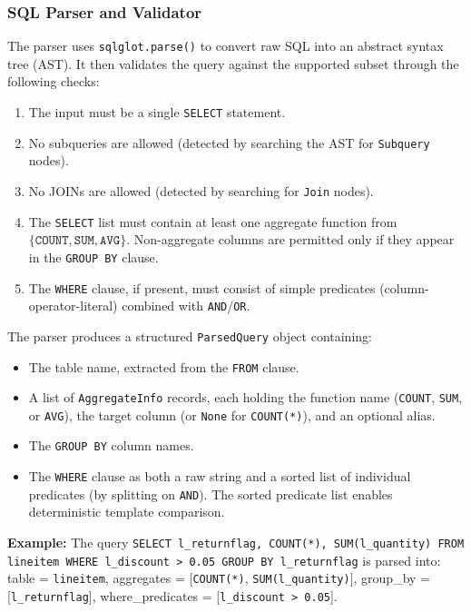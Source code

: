 \documentclass[sigconf,nonacm]{acmart}
\begin{document}
\subsubsection{SQL Parser and Validator}

The parser uses \texttt{sqlglot.parse()} to convert raw SQL into an abstract syntax tree (AST). It then validates the query against the supported subset through the following checks:

\begin{enumerate}
    \item The input must be a single \texttt{SELECT} statement.
    \item No subqueries are allowed (detected by searching the AST for \texttt{Subquery} nodes).
    \item No JOINs are allowed (detected by searching for \texttt{Join} nodes).
    \item The \texttt{SELECT} list must contain at least one aggregate function from $\{\texttt{COUNT}, \texttt{SUM}, \texttt{AVG}\}$. Non-aggregate columns are permitted only if they appear in the \texttt{GROUP BY} clause.
    \item The \texttt{WHERE} clause, if present, must consist of simple predicates (column-operator-literal) combined with \texttt{AND}/\texttt{OR}.
\end{enumerate}

The parser produces a structured \texttt{ParsedQuery} object containing:
\begin{itemize}
    \item The table name, extracted from the \texttt{FROM} clause.
    \item A list of \texttt{AggregateInfo} records, each holding the function name (\texttt{COUNT}, \texttt{SUM}, or \texttt{AVG}), the target column (or \texttt{None} for \texttt{COUNT(*)}), and an optional alias.
    \item The \texttt{GROUP BY} column names.
    \item The \texttt{WHERE} clause as both a raw string and a sorted list of individual predicates (by splitting on \texttt{AND}). The sorted predicate list enables deterministic template comparison.
\end{itemize}

\noindent\textbf{Example:} The query \texttt{SELECT l\_returnflag, COUNT(*), SUM(l\_quantity) FROM lineitem WHERE l\_discount > 0.05 GROUP BY l\_returnflag} is parsed into: table = \texttt{lineitem}, aggregates = [\texttt{COUNT(*)}, \texttt{SUM(l\_quantity)}], group\_by = [\texttt{l\_returnflag}], where\_predicates = [\texttt{l\_discount > 0.05}].
\end{document}

